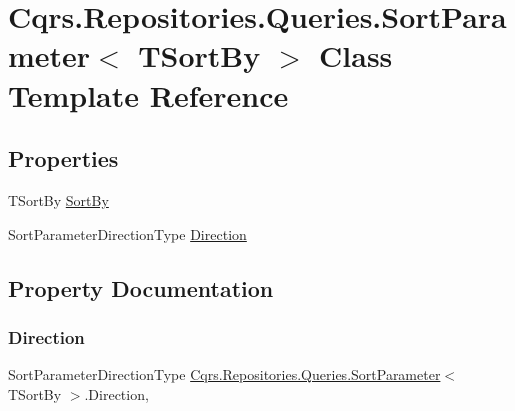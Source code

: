 \hypertarget{classCqrs_1_1Repositories_1_1Queries_1_1SortParameter}{}\section{Cqrs.\+Repositories.\+Queries.\+Sort\+Parameter$<$ T\+Sort\+By $>$ Class Template Reference}
\label{classCqrs_1_1Repositories_1_1Queries_1_1SortParameter}
\subsection*{Properties}
\begin{DoxyCompactItemize}
\item 
T\+Sort\+By \hyperlink{classCqrs_1_1Repositories_1_1Queries_1_1SortParameter_adcd8ebe48bfc697ada8b302d5acb3d00_adcd8ebe48bfc697ada8b302d5acb3d00}{Sort\+By}
\item 
Sort\+Parameter\+Direction\+Type \hyperlink{classCqrs_1_1Repositories_1_1Queries_1_1SortParameter_abbe43d8ab36bb92bc388ad72651db73f_abbe43d8ab36bb92bc388ad72651db73f}{Direction}
\end{DoxyCompactItemize}


\subsection{Property Documentation}
\mbox{\label{classCqrs_1_1Repositories_1_1Queries_1_1SortParameter_abbe43d8ab36bb92bc388ad72651db73f_abbe43d8ab36bb92bc388ad72651db73f}} 
\subsubsection{\texorpdfstring{Direction}{Direction}}
{\footnotesize\ttfamily Sort\+Parameter\+Direction\+Type \hyperlink{classCqrs_1_1Repositories_1_1Queries_1_1SortParameter}{Cqrs.\+Repositories.\+Queries.\+Sort\+Parameter}$<$ T\+Sort\+By $>$.Direction\hspace{0.3cm}{\ttfamily [get]}, {\ttfamily [set]}}

